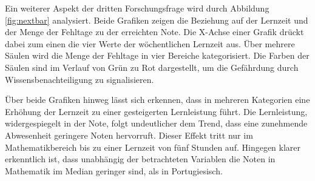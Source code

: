 Ein weiterer Aspekt der dritten Forschungsfrage wird durch Abbildung \ref{fig:nextbar} analysiert.
Beide Grafiken zeigen die Beziehung auf der Lernzeit und der Menge der Fehltage zu der erreichten Note.
Die X-Achse einer Grafik drückt dabei zum einen die vier Werte der wöchentlichen Lernzeit aus.
Über mehrere Säulen wird die Menge der Fehltage in vier Bereiche kategorisiert. 
Die Farben der Säulen sind im Verlauf von Grün zu Rot dargestellt, um die Gefährdung durch Wissensbenachteiligung zu signalisieren.

Über beide Grafiken hinweg lässt sich erkennen, dass in mehreren Kategorien eine Erhöhung der Lernzeit zu einer gesteigerten Lernleistung führt.
Die Lernleistung, widergespiegelt in der Note, folgt undeutlicher dem Trend, dass eine zunehmende Abwesenheit geringere Noten hervorruft.
Dieser Effekt tritt nur im Mathematikbereich bis zu einer Lernzeit von fünf Stunden auf.
Hingegen klarer erkenntlich ist, dass unabhängig der betrachteten Variablen die Noten in Mathematik im Median geringer sind, als in Portugiesisch.

